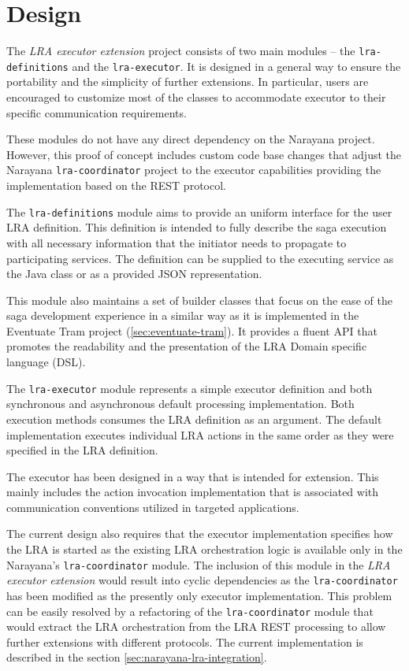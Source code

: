 \documentclass[oneside,
  digital, %
  table,   %
  lof,     %
  lot,     %
]{fithesis3}
\begin{document}
\section{Design}
\label{sec:extension-design}

The \textit{LRA executor extension} project consists of two main modules -- the \texttt{lra-definitions} and the \texttt{lra-executor}. It is designed in a general way to ensure the portability and the simplicity of further extensions. In particular, users are encouraged to customize most of the classes to accommodate executor to their specific communication requirements.

These modules do not have any direct dependency on the Narayana project. However, this proof of concept includes custom code base changes that adjust the Narayana \texttt{lra-coordinator} project to the executor capabilities providing the implementation based on the REST protocol.

The \texttt{lra-definitions} module aims to provide an uniform interface for the user LRA definition. This definition is intended to fully describe the saga execution with all necessary information that the initiator needs to propagate to participating services. The definition can be supplied to the executing service as the Java class or as a provided JSON representation.

This module also maintains a set of builder classes that focus on the ease of the saga development experience in a similar way as it is implemented in the Eventuate Tram project (\ref{sec:eventuate-tram}). It provides a fluent API that promotes the readability and the presentation of the LRA Domain specific language (DSL).  

The \texttt{lra-executor} module represents a simple executor definition and both synchronous and asynchronous default processing implementation. Both execution methods consumes the LRA definition as an argument. The default implementation executes individual LRA actions in the same order as they were specified in the LRA definition.

The executor has been designed in a way that is intended for extension. This mainly includes the action invocation implementation that is associated with communication conventions utilized in targeted applications. 

The current design also requires that the executor implementation specifies how the LRA is started as the existing LRA orchestration logic is available only in the Narayana's \texttt{lra-coordinator} module. The inclusion of this module in the \textit{LRA executor extension} would result into cyclic dependencies as the \texttt{lra-coordinator} has been modified as the presently only executor implementation. This problem can be easily resolved by a refactoring of the \texttt{lra-coordinator} module that would extract the LRA orchestration from the LRA REST processing to allow further extensions with different protocols. The current implementation is described in the section \ref{sec:narayana-lra-integration}.
\end{document}
